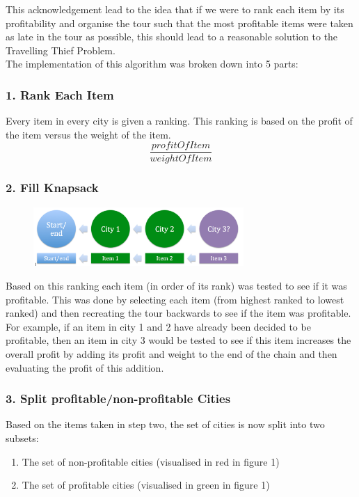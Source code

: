\documentclass[a4paper,12pt]{article}
\begin{document}
This acknowledgement lead to the idea that if we were to rank each item by its profitability and organise the tour such that the most profitable items were taken as late in the tour as possible, this should lead to a reasonable solution to the Travelling Thief Problem.\\
The implementation of this algorithm was broken down into 5 parts:

\subsubsection*{1. Rank Each Item}
Every item in every city is given a ranking. This ranking is based on the profit of the item versus the weight of the item.
\begin{equation}
\frac{profitOfItem}{weightOfItem}
\end{equation}

\subsubsection*{2. Fill Knapsack}
\begin{figure}[h]
\centering
\includegraphics[width=80mm]{AddItem.png}
\end{figure}
Based on this ranking each item (in order of its rank) was tested to see if it was profitable. This was done by selecting each item (from highest ranked to lowest ranked) and then recreating the tour backwards to see if the item was profitable. For example, if an item in city 1 and 2 have already been decided to be profitable, then an item in city 3 would be tested to see if this item increases the overall profit by adding its profit and weight to the end of the chain and then evaluating the profit of this addition.

\subsubsection*{3. Split profitable/non-profitable Cities}
Based on the items taken in step two, the set of cities is now split into two subsets:

\begin{enumerate}
\item The set of non-profitable cities (visualised in red in figure 1)
\item The set of profitable cities (visualised in green in figure 1)
\end{enumerate}
\end{document}
